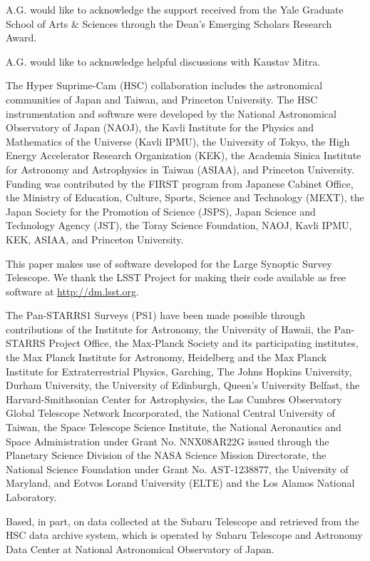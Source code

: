 A.G. would like to acknowledge the support received from the Yale Graduate School of Arts \& Sciences through the Dean's Emerging Scholars Research Award.

A.G. would like to acknowledge helpful discussions with Kaustav Mitra. 

The Hyper Suprime-Cam (HSC) collaboration includes the astronomical communities of Japan and Taiwan, and Princeton University. The HSC instrumentation and software were developed by the National Astronomical Observatory of Japan (NAOJ), the Kavli Institute for the Physics and Mathematics of the Universe (Kavli IPMU), the University of Tokyo, the High Energy Accelerator Research Organization (KEK), the Academia Sinica Institute for Astronomy and Astrophysics in Taiwan (ASIAA), and Princeton University. Funding was contributed by the FIRST program from Japanese Cabinet Office, the Ministry of Education, Culture, Sports, Science and Technology (MEXT), the Japan Society for the Promotion of Science (JSPS), Japan Science and Technology Agency (JST), the Toray Science Foundation, NAOJ, Kavli IPMU, KEK, ASIAA, and Princeton University. 

This paper makes use of software developed for the Large Synoptic Survey Telescope. We thank the LSST Project for making their code available as free software at  \href{http://dm.lsst.org}{http://dm.lsst.org}.

The Pan-STARRS1 Surveys (PS1) have been made possible through contributions of the Institute for Astronomy, the University of Hawaii, the Pan-STARRS Project Office, the Max-Planck Society and its participating institutes, the Max Planck Institute for Astronomy, Heidelberg and the Max Planck Institute for Extraterrestrial Physics, Garching, The Johns Hopkins University, Durham University, the University of Edinburgh, Queen’s University Belfast, the Harvard-Smithsonian Center for Astrophysics, the Las Cumbres Observatory Global Telescope Network Incorporated, the National Central University of Taiwan, the Space Telescope Science Institute, the National Aeronautics and Space Administration under Grant No. NNX08AR22G issued through the Planetary Science Division of the NASA Science Mission Directorate, the National Science Foundation under Grant No. AST-1238877, the University of Maryland, and Eotvos Lorand University (ELTE) and the Los Alamos National Laboratory.

Based, in part, on data collected at the Subaru Telescope and retrieved from the HSC data archive system, which is operated by Subaru Telescope and Astronomy Data Center at National Astronomical Observatory of Japan.




